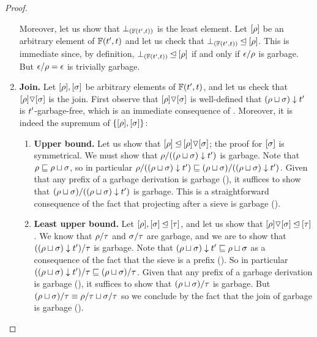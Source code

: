 \begin{proof}
\begin{enumerate}
  Moreover, let us show that $\bot_{(\mathbb{F}(t', t))}$ is the least element.
  Let $[\rho]$ be an arbitrary element of $\mathbb{F}(t', t)$
  and let us check that $\bot_{(\mathbb{F}(t', t))} \unlhd [\rho]$.
  This is immediate since,
  by definition, $\bot_{(\mathbb{F}(t', t))} \unlhd [\rho]$
  if and only if $\epsilon/\rho$ is garbage.
  But $\epsilon/\rho = \epsilon$ is trivially garbage.
\item {\bf Join.}
  Let $[\rho],[\sigma]$ be arbitrary elements of $\mathbb{F}(t', t)$,
  and let us check that $[\rho] \triangledown [\sigma]$ is the join.
  First observe that $[\rho] \triangledown [\sigma]$ is well-defined
  \ie that $(\rho \sqcup \sigma) \downarrow t'$ is $t'$-garbage-free,
  which is an immediate consequence of .
  Moreover, it is indeed the supremum of $\{[\rho],[\sigma]\}$:
  \begin{enumerate}
  \item {\bf Upper bound.}
    Let us show that $[\rho] \unlhd [\rho] \triangledown [\sigma]$; the proof for $[\sigma]$ is symmetrical.
    We must show that $\rho/((\rho \sqcup \sigma) \downarrow t')$ is garbage.
    Note that $\rho \sqsubseteq \rho \sqcup \sigma$,
    so in particular $\rho/((\rho \sqcup \sigma) \downarrow t') \sqsubseteq (\rho \sqcup \sigma)/((\rho \sqcup \sigma) \downarrow t')$.
    Given that any prefix of a garbage derivation is garbage (),
    it suffices to show that $(\rho \sqcup \sigma)/((\rho \sqcup \sigma) \downarrow t')$ is garbage.
    This is a straightforward consequence of the fact that projecting after a sieve is garbage ().
  \item {\bf Least upper bound.}
    Let $[\rho], [\sigma] \unlhd [\tau]$,
    and let us show that $[\rho] \triangledown [\sigma] \unlhd [\tau]$.
    We know that $\rho/\tau$ and $\sigma/\tau$ are garbage,
    and we are to show that $((\rho \sqcup \sigma) \downarrow t')/\tau$
    is garbage.
    Note that $(\rho \sqcup \sigma) \downarrow t' \sqsubseteq \rho \sqcup \sigma$
    as a consequence of the fact that the sieve is a prefix ().
    So in particular $((\rho \sqcup \sigma) \downarrow t')/\tau \sqsubseteq (\rho \sqcup \sigma)/\tau$.
    Given that any prefix of a garbage derivation is garbage (),
    it suffices to show that $(\rho \sqcup \sigma)/\tau$ is garbage.
    But $(\rho \sqcup \sigma)/\tau \equiv \rho/\tau \sqcup \sigma/\tau$
    so we conclude by the fact that the join of garbage is garbage ().
  \end{enumerate}
\end{enumerate}
\end{proof}

